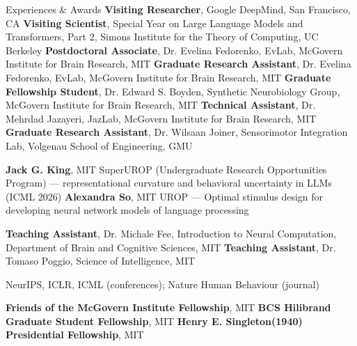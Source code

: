\begin{rubric}{Experiences \& Awards}
\entry*[2025--Present] \textbf{Visiting Researcher}, Google DeepMind, San Francisco, CA
\entry*[Spring 2025] \textbf{Visiting Scientist}, Special Year on Large Language Models and Transformers, Part 2, Simons Institute for the Theory of Computing, UC Berkeley
\entry*[2024--2025] \textbf{Postdoctoral Associate}, Dr. Evelina Fedorenko, EvLab, McGovern Institute for Brain Research, MIT
\entry*[2019--2024] \textbf{Graduate Research Assistant}, Dr. Evelina Fedorenko, EvLab, McGovern Institute for Brain Research, MIT
\entry*[2017--2018] \textbf{Graduate Fellowship Student}, Dr. Edward S. Boyden, Synthetic Neurobiology Group, McGovern Institute for Brain Research, MIT
\entry*[2015--2016] \textbf{Technical Assistant}, Dr. Mehrdad Jazayeri, JazLab, McGovern Institute for Brain Research, MIT
\entry*[2013--2014] \textbf{Graduate Research Assistant}, Dr. Wilsaan Joiner, Sensorimotor Integration Lab, Volgenau School of Engineering, GMU

\entry*[2024--2026] \textbf{Jack G. King}, MIT SuperUROP (Undergraduate Research Opportunities Program) --- representational curvature and behavioral uncertainty in LLMs (ICML 2026)
\entry*[2020--2022] \textbf{Alexandra So}, MIT UROP --- Optimal stimulus design for developing neural network models of language processing

\entry*[2020] \textbf{Teaching Assistant}, Dr. Michale Fee, Introduction to Neural Computation, Department of Brain and Cognitive Sciences, MIT
\entry*[2017] \textbf{Teaching Assistant}, Dr. Tomaso Poggio, Science of Intelligence, MIT

\entry*[2024--Present] NeurIPS, ICLR, ICML (conferences); Nature Human Behaviour (journal)

\entry*[2020] \textbf{Friends of the McGovern Institute Fellowship},  MIT
\entry*[2017--2018] \textbf{BCS Hilibrand Graduate Student Fellowship},  MIT
\entry*[2016--2017] \textbf{Henry E. Singleton(1940) Presidential Fellowship},  MIT
%
\end{rubric}